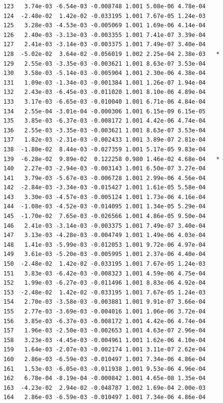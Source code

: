 \documentclass[
  letterpaper,
  DIV=11,
  numbers=noendperiod]{scrartcl}
\begin{document}
\begin{verbatim}
123   3.74e-03 -6.54e-03 -0.008748 1.001 5.08e-06 4.78e-04    
124  -2.48e-02  1.42e-02 -0.033195 1.001 7.67e-05 1.24e-03    
125   3.28e-03 -4.53e-03 -0.005069 1.001 1.69e-06 4.14e-04    
126   2.40e-03 -3.13e-03 -0.003355 1.001 7.41e-07 3.39e-04    
127   2.41e-03 -3.14e-03 -0.003375 1.001 7.49e-07 3.40e-04    
128  -5.02e-02  3.64e-02 -0.056019 1.002 2.25e-04 2.38e-03   *
129   2.55e-03 -3.35e-03 -0.003621 1.001 8.63e-07 3.53e-04    
130   3.58e-03 -5.14e-03 -0.005904 1.001 2.30e-06 4.38e-04    
131   1.09e-03 -1.34e-03 -0.001384 1.001 1.26e-07 1.94e-04    
132   2.43e-03 -6.45e-03 -0.011020 1.001 8.10e-06 4.89e-04    
133   3.17e-03 -6.65e-03 -0.010040 1.001 6.71e-06 4.84e-04    
134   2.55e-04 -3.01e-04 -0.000306 1.001 6.15e-09 6.15e-05    
135   3.85e-03 -6.37e-03 -0.008172 1.001 4.42e-06 4.74e-04    
136   2.55e-03 -3.35e-03 -0.003621 1.001 8.63e-07 3.53e-04    
137   1.82e-03 -2.31e-03 -0.002433 1.001 3.89e-07 2.81e-04    
138  -1.80e-02  8.44e-03 -0.027359 1.001 5.17e-05 9.83e-04    
139  -6.28e-02  9.89e-02  0.122258 0.980 1.46e-02 4.68e-04   *
140   2.27e-03 -2.94e-03 -0.003143 1.001 6.50e-07 3.27e-04    
141   3.79e-03 -5.67e-03 -0.006728 1.001 2.99e-06 4.56e-04    
142  -2.84e-03 -3.34e-03 -0.015427 1.001 1.61e-05 5.58e-04    
143   3.30e-03 -4.57e-03 -0.005124 1.001 1.73e-06 4.16e-04    
144  -1.08e-03 -4.52e-03 -0.014095 1.001 1.34e-05 5.29e-04    
145  -1.70e-02  7.65e-03 -0.026566 1.001 4.86e-05 9.50e-04    
146   2.41e-03 -3.14e-03 -0.003375 1.001 7.49e-07 3.40e-04    
147   3.13e-03 -4.28e-03 -0.004749 1.001 1.49e-06 4.03e-04    
148   1.41e-03 -5.99e-03 -0.012053 1.001 9.72e-06 4.97e-04    
149   3.61e-03 -5.20e-03 -0.005995 1.001 2.37e-06 4.40e-04    
150  -2.48e-02  1.42e-02 -0.033195 1.001 7.67e-05 1.24e-03    
151   3.83e-03 -6.42e-03 -0.008323 1.001 4.59e-06 4.75e-04    
152   1.99e-03 -6.27e-03 -0.011496 1.001 8.83e-06 4.92e-04    
153  -2.48e-02  1.42e-02 -0.033195 1.001 7.67e-05 1.24e-03    
154   2.70e-03 -3.58e-03 -0.003881 1.001 9.91e-07 3.66e-04    
155   2.77e-03 -3.69e-03 -0.004016 1.001 1.06e-06 3.72e-04    
156   3.85e-03 -6.37e-03 -0.008172 1.001 4.42e-06 4.74e-04    
157   1.96e-03 -2.50e-03 -0.002653 1.001 4.63e-07 2.96e-04    
158   3.23e-03 -4.45e-03 -0.004961 1.001 1.62e-06 4.10e-04    
159   1.64e-03 -2.07e-03 -0.002174 1.001 3.11e-07 2.62e-04    
160   2.86e-03 -6.59e-03 -0.010497 1.001 7.34e-06 4.86e-04    
161   1.53e-03 -6.05e-03 -0.011938 1.001 9.53e-06 4.96e-04    
162   6.78e-04 -8.19e-04 -0.000842 1.001 4.65e-08 1.35e-04    
163  -4.23e-02  2.94e-02 -0.048787 1.002 1.69e-04 2.00e-03    
164   2.86e-03 -6.59e-03 -0.010497 1.001 7.34e-06 4.86e-04    

\end{verbatim}
\end{document}
